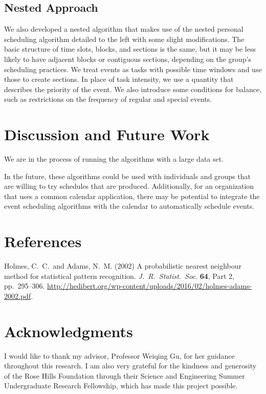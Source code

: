 \documentclass[thesis]{hmcposter}
\begin{document}
\begin{poster}
\subsection{Nested Approach}
We also developed a nested algorithm that makes use of the nested personal scheduling algorithm detailed to the left with some slight modifications.
The basic structure of time slots, blocks, and sections is the same, but it may be less likely to have adjacent blocks or contiguous sections, depending on the group's scheduling practices.
We treat events as tasks with possible time windows and use those to create sections.
In place of task intensity, we use a quantity that describes the priority of the event.
We also introduce some conditions for balance, such as restrictions on the frequency of regular and special events.


\section{Discussion and Future Work}
We are in the process of running the algorithms with a large data set.

In the future, these algorithms could be used with individuals and groups that are willing to try schedules that are produced.
Additionally, for an organization that uses a common calendar application, there may be potential to integrate the event scheduling algorithms with the calendar to automatically schedule events.


\section{References}

%
Holmes, C.~C.~and Adams, N.~M. (2002) A probabilistic nearest neighbour method for statistical pattern recognition. \emph{J.~R.~Statist.~Soc}. \textbf{64}, Part 2, pp.~295--306.
 \url{http://hedibert.org/wp-content/uploads/2016/02/holmes-adams-2002.pdf}.


\section{Acknowledgments}
I would like to thank my advisor, Professor Weiqing Gu, for her guidance throughout this research.
I am also very grateful for the kindness and generosity of the Rose Hills Foundation through their Science and Engineering Summer Undergraduate Research Fellowship, which has made this project possible.


\end{poster}
\end{document}
